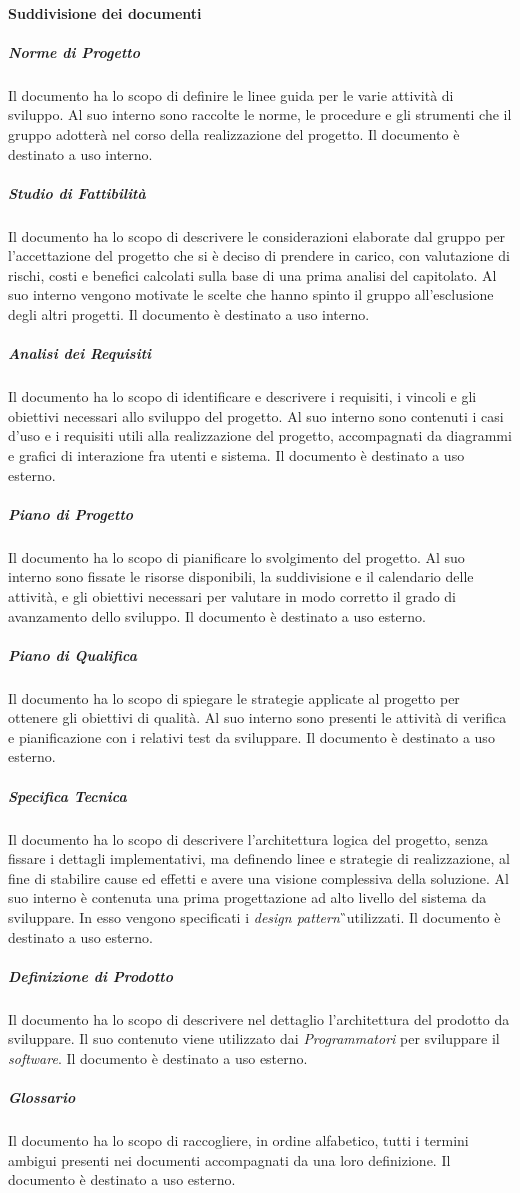 \paragraph{Suddivisione dei documenti}
\label{sec:suddivisioneDocumenti}
\subparagraph{Norme di Progetto}
Il documento ha lo scopo di definire le linee guida per le varie attività di sviluppo. Al suo interno sono raccolte le norme, le procedure e gli strumenti che il gruppo adotterà nel corso della realizzazione del progetto. Il documento è destinato a uso interno.
\subparagraph{Studio di Fattibilità}
Il documento ha lo scopo di descrivere le considerazioni elaborate dal gruppo per l'accettazione del progetto che si è deciso di prendere in carico, con valutazione di rischi, costi e benefici calcolati sulla base di una prima analisi del capitolato. Al suo interno vengono motivate le scelte che hanno spinto il gruppo all'esclusione degli altri progetti. Il documento è destinato a uso interno.
\subparagraph{Analisi dei Requisiti}
Il documento ha lo scopo di identificare e descrivere i requisiti, i vincoli e gli obiettivi necessari allo sviluppo del progetto. Al suo interno sono contenuti i casi d'uso e i requisiti utili alla realizzazione del progetto, accompagnati da diagrammi e grafici di interazione fra utenti e sistema. Il documento è destinato a uso esterno.
\subparagraph{Piano di Progetto}
Il documento ha lo scopo di pianificare lo svolgimento del progetto. Al suo interno sono fissate le risorse disponibili, la suddivisione e il calendario delle attività, e gli obiettivi necessari per valutare in modo corretto il grado di avanzamento dello sviluppo. Il documento è destinato a uso esterno.
\subparagraph{Piano di Qualifica}
Il documento ha lo scopo di spiegare le strategie applicate al progetto per ottenere gli obiettivi di qualità. Al suo interno sono presenti le attività di verifica e pianificazione con i relativi test da sviluppare. Il documento è destinato a uso esterno.
\subparagraph{Specifica Tecnica}
Il documento ha lo scopo di descrivere l'architettura logica del progetto, senza fissare i dettagli implementativi, ma definendo linee e strategie di realizzazione, al fine di stabilire cause ed effetti e avere una visione complessiva della soluzione. Al suo interno è contenuta una prima progettazione ad alto livello del sistema da sviluppare. In esso vengono specificati i \textit{design pattern}\G\ utilizzati. Il documento è destinato a uso esterno. 
\subparagraph{Definizione di Prodotto}
Il documento ha lo scopo di descrivere nel dettaglio l'architettura del prodotto da sviluppare. Il suo contenuto viene utilizzato dai \textit{Programmatori} per sviluppare il \textit{software}. Il documento è destinato a uso esterno.
\subparagraph{Glossario}
Il documento ha lo scopo di raccogliere, in ordine alfabetico, tutti i termini ambigui presenti nei documenti accompagnati da una loro definizione. Il documento è destinato a uso esterno.

